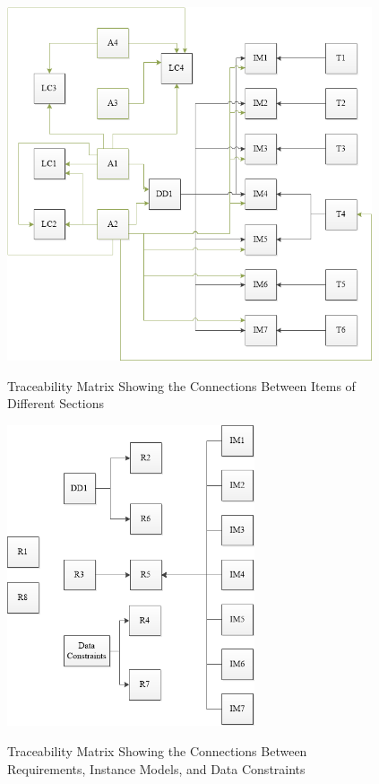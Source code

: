 \documentclass[12pt]{article}
\begin{document}
 \begin{figure}[h!]
 	\begin{center}
 		{
 			\includegraphics[width=0.96\textwidth]{figures/ATrace.png}
 		}
 		\caption{\label{Fig_ATrace} Traceability Matrix Showing the Connections 
 		Between Items of Different Sections}
 	\end{center}
 \end{figure}


 \begin{figure}[h!]
 	\begin{center}
 		{
 			\includegraphics[width=0.65\textwidth]{figures/RTrace.png}
 		}
 		\caption{\label{Fig_RTrace} Traceability Matrix Showing the Connections 
 		Between Requirements, Instance Models, and Data Constraints}
 	\end{center}
 \end{figure}
\end{document}

